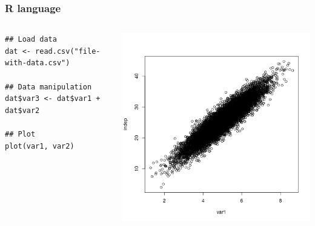 \documentclass[9pt,xcolor=pdftex,dvipsnames,table]{beamer}
\begin{document}
\begin{frame}[fragile] %
\frametitle{\textbf{R language}}
\begin{columns}
\begin{example}[]
\begin{verbatim}
## Load data
dat <- read.csv("file-with-data.csv")

## Data manipulation
dat$var3 <- dat$var1 + dat$var2

## Plot
plot(var1, var2)
\end{verbatim} %
\end{example}
\includegraphics[width=1\textwidth]{images/corr.png}
\end{columns}
\end{frame}
\end{document}
